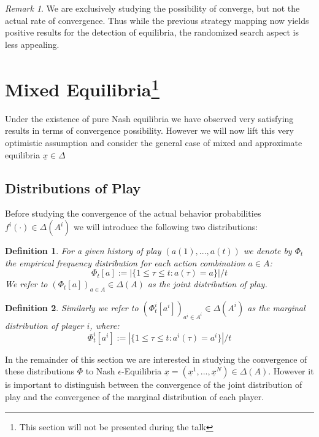 \documentclass[a4paper]{article}
\theoremstyle{plain}
\newtheorem{definition}{Definition}
\theoremstyle{remark}
\newtheorem{remark}{Remark}
\newcommand{\eq}[1]{\underline{#1}}
\begin{document}
\begin{remark}
	We are exclusively studying the possibility of converge, but not the actual rate of convergence.
	Thus while the previous strategy mapping now yields positive results for the detection of equilibria,
	the randomized search aspect is less appealing.
\end{remark}


\section{Mixed Equilibria\footnote{This section will not be presented during the talk}}

Under the existence of pure Nash equilibria we have observed very satisfying results in terms of convergence
possibility. However we will now lift this very optimistic assumption and consider the general case of mixed and
approximate equilibria $\eq{x} \in \Delta$


\subsection{Distributions of Play}

Before studying the convergence of the actual behavior probabilities $f^i(\cdot) \in \Delta(A^i)$ we will
introduce the following two distributions:

\begin{definition}
	For a given history of play $(a(1), ..., a(t))$ we denote by $\Phi_t$  the empirical frequency
	distribution for each action combination $a \in A$:
	$$
		\Phi_t[a] := |\{ 1 \leq \tau \leq t : a(\tau) = a \}|/t
	$$
	We refer to $(\Phi_t[a])_{a \in A} \in \Delta(A)$ as the joint distribution of play.
\end{definition}
\begin{definition}
	Similarly we refer to $(\Phi_t^i[a^i])_{a^i \in A^i} \in \Delta(A^i)$ as the marginal distribution of player $i$, where:
	$$
		\Phi_t^i[a^i] := |\{ 1 \leq \tau \leq t : a^i(\tau) = a^i \}|/t
	$$
\end{definition}

In the remainder of this section we are interested in studying the convergence of these distributions $\Phi$ to Nash 
$\epsilon$-Equilibria $\eq{x} = (\eq{x}^1, ..., \eq{x}^N) \in \Delta(A)$.
However it is important to distinguish between the convergence of the joint distribution of play
and the convergence of the marginal distribution of each player.
\end{document}
